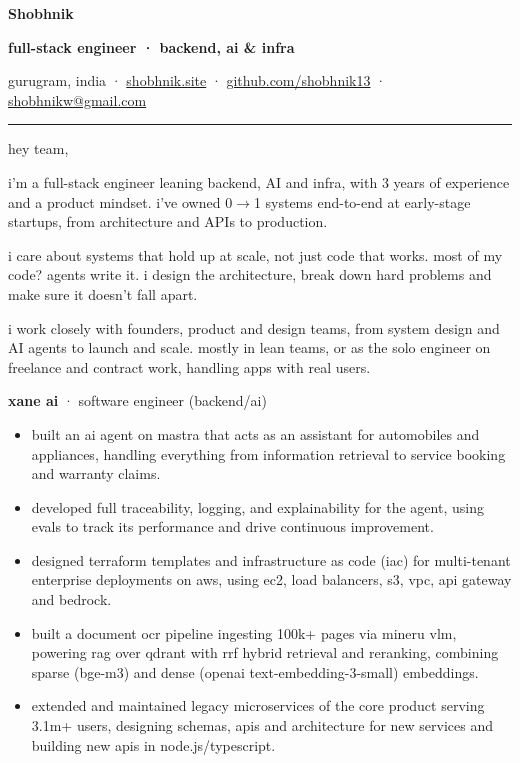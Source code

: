\documentclass[10pt,a4paper]{article}
\newcommand{\heading}[1]{\vspace{4pt}{\color{accent}\footnotesize\bfseries\MakeUppercase{#1}}\par\vspace{-2pt}}
\newcommand{\lnk}[2]{\href{#1}{#2}}
\newcommand{\hr}{{\color{rulegray}\rule{\linewidth}{0.6pt}}}
\begin{document}
{\LARGE\bfseries Shobhnik}\par
\vspace{2pt}
{\color{accent}\bfseries full-stack engineer · backend, ai \& infra}\par
{\color{muted}gurugram, india · \lnk{https://shobhnik.site}{shobhnik.site} · \lnk{https://github.com/shobhnik13}{github.com/shobhnik13} · \lnk{mailto:shobhnikw@gmail.com}{shobhnikw@gmail.com}}\par
\vspace{-2pt}
\hr

hey team,

i'm a full-stack engineer leaning backend, AI and infra, with 3 years of experience and a product mindset. i've owned 0$\rightarrow$1 systems end-to-end at early-stage startups, from architecture and APIs to production.

i care about systems that hold up at scale, not just code that works. most of my code? agents write it. i design the architecture, break down hard problems and make sure it doesn't fall apart.

i work closely with founders, product and design teams, from system design and AI agents to launch and scale. mostly in lean teams, or as the solo engineer on freelance and contract work, handling apps with real users.

\heading{what i've done}

\textbf{xane ai} {\color{muted}· software engineer (backend/ai)}
\begin{itemize}
\item built an ai agent on mastra that acts as an assistant for automobiles and appliances, handling everything from information retrieval to service booking and warranty claims.
\item developed full traceability, logging, and explainability for the agent, using evals to track its performance and drive continuous improvement.
\item designed terraform templates and infrastructure as code (iac) for multi-tenant enterprise deployments on aws, using ec2, load balancers, s3, vpc, api gateway and bedrock.
\item built a document ocr pipeline ingesting 100k+ pages via mineru vlm, powering rag over qdrant with rrf hybrid retrieval and reranking, combining sparse (bge-m3) and dense (openai text-embedding-3-small) embeddings.
\item extended and maintained legacy microservices of the core product serving 3.1m+ users, designing schemas, apis and architecture for new services and building new apis in node.js/typescript.
\end{itemize}
\end{document}
